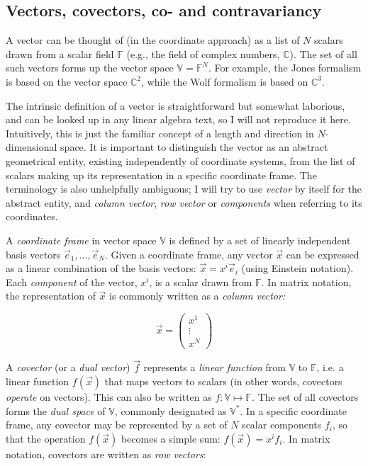 \documentclass[]{aa}
\begin{document}
\subsection{Vectors, covectors, co- and contravariancy}
\label{sec:covectors}

A vector can be thought of (in the coordinate approach) as a list of $N$ scalars drawn from a scalar field $\mathbb{F}$ (e.g., the field of complex numbers, $\mathbb{C}$). The set of all such vectors forms up the vector space $\mathbb{V}=\mathbb{F}^N$. For example, the Jones formalism is based on the vector space $\mathbb{C}^2$, while the Wolf formalism is based on $\mathbb{C}^3$. 

The intrinsic definition of a vector is straightforward but somewhat laborious, and can be looked up in any linear algebra text, so I will not reproduce it here. Intuitively, this is just the familiar concept of a length and direction in $N$-dimensional space. It is important to distinguish the vector as an abstract geometrical entity, existing independently of coordinate systems, from the list of scalars making up its representation in a specific coordinate frame. The terminology is also unhelpfully ambiguous; I will try to use \emph{vector} by itself for the abstract entity, and \emph{column vector}, \emph{row vector} or \emph{components} when referring to its coordinates. 

A {\em coordinate frame} in vector space $\mathbb{V}$ is defined by a set of linearly independent basis vectors $\vec e_1,...,\vec e_N$. Given a coordinate frame, any  vector $\vec x$ can be expressed as a linear combination of the basis vectors: $\vec x = x^i \vec e_i$ (using Einstein notation). Each \emph{component} of the vector, $x^i$, is a scalar drawn from $\mathbb{F}$. In matrix notation, the representation of $\vec x$ is commonly written as a \emph{column vector:}

\[
  \vec x = \left ( \begin{array}{c} x^1\\ \vdots \\ x^N \end{array} \right )
\]


A \emph{covector} (or a {\em dual vector\/}) $\vec f$ represents a {\em linear function} from $\mathbb{V}$ to $\mathbb{F}$, i.e. a linear function $f(\vec x)$ that maps vectors to scalars (in other words, covectors {\em operate\/} on vectors). This can also be written as $f:\mathbb{V}\mapsto\mathbb{F}$. The set of all covectors forms the {\em dual space\/} of $\mathbb{V}$, commonly designated as $\mathbb{V}^*$. In a specific coordinate frame, any covector may be represented by a set of $N$ scalar components $f_i$, so that the operation  $f(\vec x)$ becomes a simple sum: $f(\vec x) = x^if_i.$ In matrix notation, covectors are written as \emph{row vectors\/}:
\end{document}
